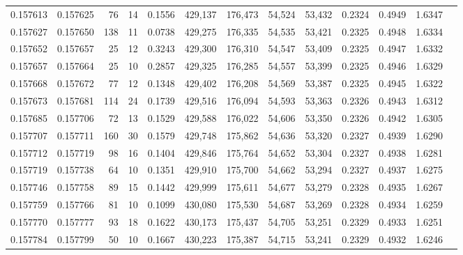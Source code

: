 \begin{tabular}{rrrrrrrrrrrrr}
0.157613 & 0.157625 &    76 &  14 &                                     0.1556 & 429,137 & 176,473 &  54,524 &  53,432 & 0.2324 & 0.4949 & 1.6347 \\
0.157627 & 0.157650 &   138 &  11 &                                     0.0738 & 429,275 & 176,335 &  54,535 &  53,421 & 0.2325 & 0.4948 & 1.6334 \\
0.157652 & 0.157657 &    25 &  12 &                                     0.3243 & 429,300 & 176,310 &  54,547 &  53,409 & 0.2325 & 0.4947 & 1.6332 \\
0.157657 & 0.157664 &    25 &  10 &                                     0.2857 & 429,325 & 176,285 &  54,557 &  53,399 & 0.2325 & 0.4946 & 1.6329 \\
0.157668 & 0.157672 &    77 &  12 &                                     0.1348 & 429,402 & 176,208 &  54,569 &  53,387 & 0.2325 & 0.4945 & 1.6322 \\
0.157673 & 0.157681 &   114 &  24 &                                     0.1739 & 429,516 & 176,094 &  54,593 &  53,363 & 0.2326 & 0.4943 & 1.6312 \\
0.157685 & 0.157706 &    72 &  13 &                                     0.1529 & 429,588 & 176,022 &  54,606 &  53,350 & 0.2326 & 0.4942 & 1.6305 \\
0.157707 & 0.157711 &   160 &  30 &                                     0.1579 & 429,748 & 175,862 &  54,636 &  53,320 & 0.2327 & 0.4939 & 1.6290 \\
0.157712 & 0.157719 &    98 &  16 &                                     0.1404 & 429,846 & 175,764 &  54,652 &  53,304 & 0.2327 & 0.4938 & 1.6281 \\
0.157719 & 0.157738 &    64 &  10 &                                     0.1351 & 429,910 & 175,700 &  54,662 &  53,294 & 0.2327 & 0.4937 & 1.6275 \\
0.157746 & 0.157758 &    89 &  15 &                                     0.1442 & 429,999 & 175,611 &  54,677 &  53,279 & 0.2328 & 0.4935 & 1.6267 \\
0.157759 & 0.157766 &    81 &  10 &                                     0.1099 & 430,080 & 175,530 &  54,687 &  53,269 & 0.2328 & 0.4934 & 1.6259 \\
0.157770 & 0.157777 &    93 &  18 &                                     0.1622 & 430,173 & 175,437 &  54,705 &  53,251 & 0.2329 & 0.4933 & 1.6251 \\
0.157784 & 0.157799 &    50 &  10 &                                     0.1667 & 430,223 & 175,387 &  54,715 &  53,241 & 0.2329 & 0.4932 & 1.6246 \\

\end{tabular}
